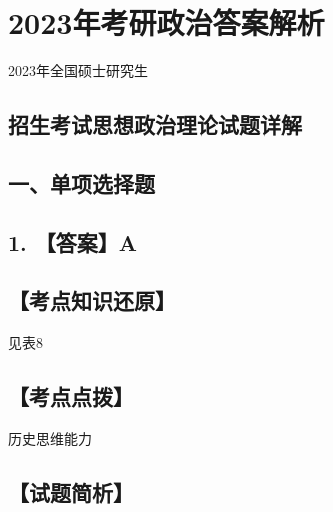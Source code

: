\documentclass[UTF8,11pt]{ctexart}
\begin{document}
\section*{2023年考研政治答案解析}
2023年全国硕士研究生


\subsection*{招生考试思想政治理论试题详解}

\subsection*{一、单项选择题}

\subsection*{1. 【答案】A}

\subsection*{【考点知识还原】}

见表8


\subsection*{【考点点拨】}

历史思维能力


\subsection*{【试题简析】}
\end{document}
